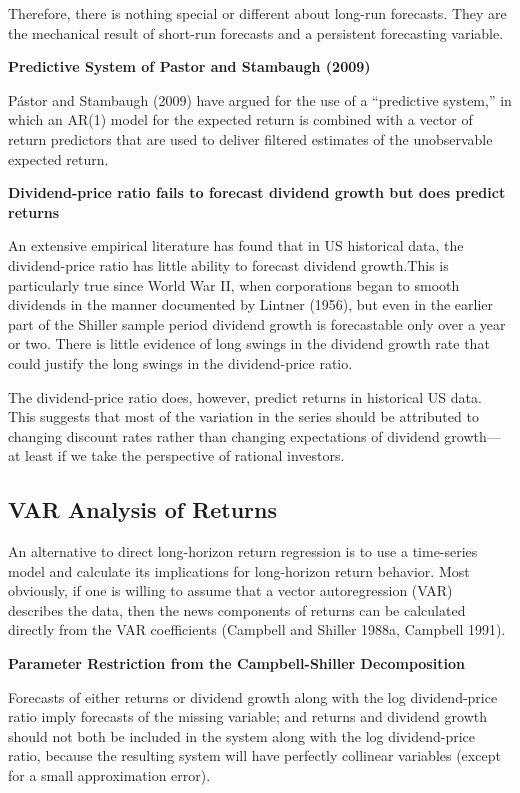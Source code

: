 \documentclass[
]{book}
\begin{document}
Therefore, there is nothing special or different about long-run forecasts. They are the mechanical result of short-run forecasts and a persistent forecasting variable.

\textbf{Predictive System of Pastor and Stambaugh (2009)}

Pástor and Stambaugh (2009) have argued for the use of a ``predictive system,'' in which an AR(1) model for the expected return is combined with a vector of return predictors that are used to deliver filtered estimates of the unobservable expected return.

\textbf{Dividend-price ratio fails to forecast dividend growth but does predict returns}

An extensive empirical literature has found that in US historical data, the dividend-price ratio has little ability to forecast dividend growth.This is particularly true since World War II, when corporations began to smooth dividends in the manner documented by Lintner (1956), but even in the earlier part of the Shiller sample period dividend growth is forecastable only over a year or two. There is little evidence of long swings in the dividend growth rate that could justify the long swings in the dividend-price ratio.

The dividend-price ratio does, however, predict returns in historical US data. This suggests that most of the variation in the series should be attributed to changing discount rates rather than changing expectations of dividend growth---at least if we take the perspective of rational investors.

\hypertarget{var-analysis-of-returns}{%
\subsection{VAR Analysis of Returns}\label{var-analysis-of-returns}}

An alternative to direct long-horizon return regression is to use a time-series model and calculate its implications for long-horizon return behavior. Most obviously, if one is willing to assume that a vector autoregression (VAR) describes the data, then the news components of returns can be calculated directly from the VAR coefficients (Campbell and Shiller 1988a, Campbell 1991).

\textbf{Parameter Restriction from the Campbell-Shiller Decomposition}

Forecasts of either returns or dividend growth along with the log dividend-price ratio imply forecasts of the missing variable; and returns and dividend growth should not both be included in the system along with the log dividend-price ratio, because the resulting system will have perfectly collinear variables (except for a small approximation error).
\end{document}
